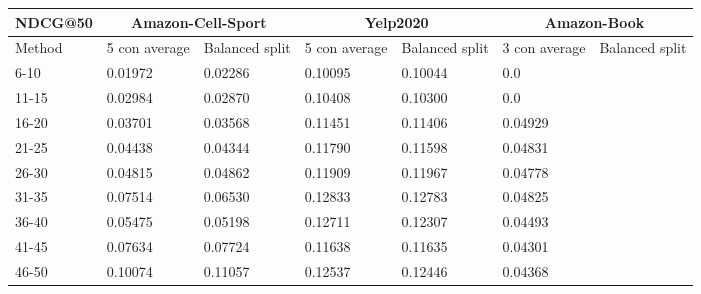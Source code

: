 \begin{table*}[h!]
    \centering
    \begin{tabular}{|l|l|l||l|l||l|l|}
        \hline
        NDCG@50  & \multicolumn{2}{c||}{Amazon-Cell-Sport} & \multicolumn{2}{c||}{Yelp2020} & \multicolumn{2}{c|}{Amazon-Book}                                                   \\ \hline
        Method   & 5 con average                           & Balanced split                 & 5 con average                    & Balanced split & 3 con average & Balanced split \\ \hline
        6-10     & 0.01972                                 & 0.02286                        & 0.10095                          & 0.10044        & 0.0           &                \\ \hline
        11-15    & 0.02984                                 & 0.02870                        & 0.10408                          & 0.10300        & 0.0           &                \\ \hline
        16-20    & 0.03701                                 & 0.03568                        & 0.11451                          & 0.11406        & 0.04929       &                \\ \hline
        21-25    & 0.04438                                 & 0.04344                        & 0.11790                          & 0.11598        & 0.04831       &                \\ \hline
        26-30    & 0.04815                                 & 0.04862                        & 0.11909                          & 0.11967        & 0.04778       &                \\ \hline
        31-35    & 0.07514                                 & 0.06530                        & 0.12833                          & 0.12783        & 0.04825       &                \\ \hline
        36-40    & 0.05475                                 & 0.05198                        & 0.12711                          & 0.12307        & 0.04493       &                \\ \hline
        41-45    & 0.07634                                 & 0.07724                        & 0.11638                          & 0.11635        & 0.04301       &                \\ \hline
        46-50    & 0.10074                                 & 0.11057                        & 0.12537                          & 0.12446        & 0.04368       &                \\ \hline

\end{tabular}
\end{table*}
